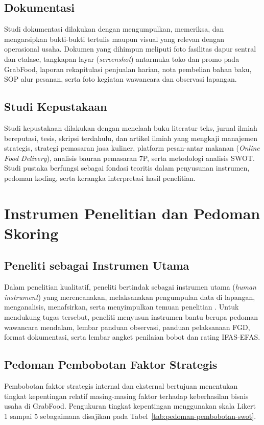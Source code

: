 \subsection{Dokumentasi}
Studi dokumentasi dilakukan dengan mengumpulkan, memeriksa, dan mengarsipkan bukti-bukti tertulis maupun visual yang relevan dengan operasional usaha. Dokumen yang dihimpun meliputi foto fasilitas dapur sentral dan etalase, tangkapan layar (\textit{screenshot}) antarmuka toko dan promo pada GrabFood, laporan rekapitulasi penjualan harian, nota pembelian bahan baku, SOP alur pesanan, serta foto kegiatan wawancara dan observasi lapangan.

\subsection{Studi Kepustakaan}
Studi kepustakaan dilakukan dengan menelaah buku literatur teks, jurnal ilmiah bereputasi, tesis, skripsi terdahulu, dan artikel ilmiah yang mengkaji manajemen strategis, strategi pemasaran jasa kuliner, platform pesan-antar makanan (\textit{Online Food Delivery}), analisis bauran pemasaran 7P, serta metodologi analisis SWOT. Studi pustaka berfungsi sebagai fondasi teoritis dalam penyusunan instrumen, pedoman koding, serta kerangka interpretasi hasil penelitian.

\section{Instrumen Penelitian dan Pedoman Skoring}
\subsection{Peneliti sebagai Instrumen Utama}
Dalam penelitian kualitatif, peneliti bertindak sebagai instrumen utama (\textit{human instrument}) yang merencanakan, melaksanakan pengumpulan data di lapangan, menganalisis, menafsirkan, serta menyimpulkan temuan penelitian \parencite{creswell2018qualitativeinquiry,flick2018designingqualitative}. Untuk mendukung tugas tersebut, peneliti menyusun instrumen bantu berupa pedoman wawancara mendalam, lembar panduan observasi, panduan pelaksanaan FGD, format dokumentasi, serta lembar angket penilaian bobot dan rating IFAS-EFAS.

\subsection{Pedoman Pembobotan Faktor Strategis}
Pembobotan faktor strategis internal dan eksternal bertujuan menentukan tingkat kepentingan relatif masing-masing faktor terhadap keberhasilan bisnis usaha di GrabFood. Pengukuran tingkat kepentingan menggunakan skala Likert 1 sampai 5 sebagaimana disajikan pada Tabel~\ref{tab:pedoman-pembobotan-swot}.

